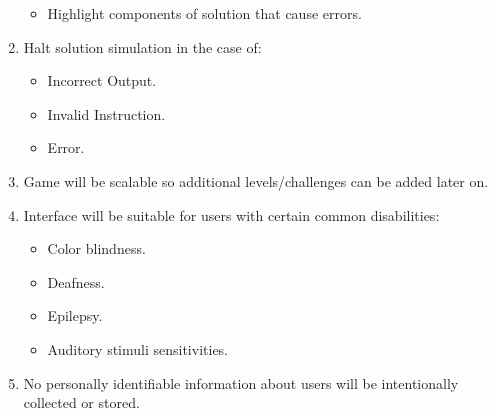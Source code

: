 \begin{enumerate}
\begin{itemize}
    \item Highlight components of solution that cause errors.
  \end{itemize}
  \item Halt solution simulation in the case of:
  \begin{itemize}
    \item Incorrect Output.
    \item Invalid Instruction.
    \item Error.
  \end{itemize}
  \item Game will be scalable so additional levels/challenges can be added later
  on.
  \item Interface will be suitable for users with certain common disabilities:
  \begin{itemize}
    \item Color blindness.
    \item Deafness.
    \item Epilepsy.
    \item Auditory stimuli sensitivities.
  \end{itemize}
  \item No personally identifiable information about users will be intentionally
  collected or stored.
\end{enumerate}

